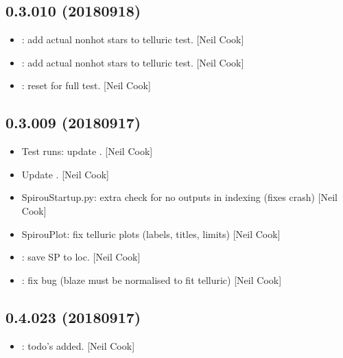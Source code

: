 \documentclass[a4paper,10pt,english]{report}
\begin{document}
\subsection{0.3.010 (2018\sphinxhyphen{}09\sphinxhyphen{}18)}
\label{\detokenize{misc/changelog:id341}}\begin{itemize}
\item {} 
: add actual non\sphinxhyphen{}hot stars to telluric test. {[}Neil Cook{]}

\item {} 
: add actual non\sphinxhyphen{}hot stars to telluric test. {[}Neil Cook{]}

\item {} 
: reset for full test. {[}Neil Cook{]}

\end{itemize}


\subsection{0.3.009 (2018\sphinxhyphen{}09\sphinxhyphen{}17)}
\label{\detokenize{misc/changelog:id342}}\begin{itemize}
\item {} 
Test runs: update . {[}Neil Cook{]}

\item {} 
Update . {[}Neil Cook{]}

\item {} 
SpirouStartup.py: extra check for no outputs in indexing (fixes crash)
{[}Neil Cook{]}

\item {} 
SpirouPlot: fix telluric plots (labels, titles, limits) {[}Neil Cook{]}

\item {} 
: save SP to loc. {[}Neil Cook{]}

\item {} 
: fix bug (blaze must be normalised to fit telluric)
{[}Neil Cook{]}

\end{itemize}


\subsection{0.4.023 (2018\sphinxhyphen{}09\sphinxhyphen{}17)}
\label{\detokenize{misc/changelog:id343}}\begin{itemize}
\item {} 
: todo’s added. {[}Neil Cook{]}

\end{itemize}
\end{document}
